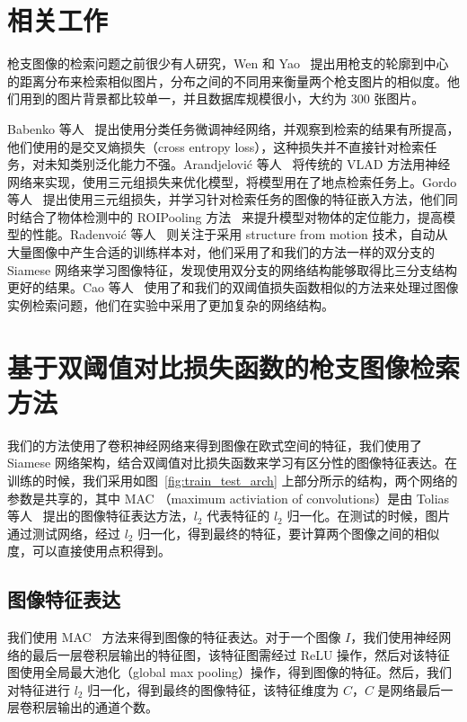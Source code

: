 \section{相关工作}\label{sec:double_margin_related_work}
枪支图像的检索问题之前很少有人研究，Wen 和 Yao~\cite{Wen2005PistolIR} 提出用枪支的轮廓到中心的距离分布来检索相似图片，分布之间的不同用来衡量两个枪支图片的相似度。他们用到的图片背景都比较单一，并且数据库规模很小，大约为 300 张图片。

Babenko 等人~\cite{Babenko2014NeuralCF} 提出使用分类任务微调神经网络，并观察到检索的结果有所提高，他们使用的是交叉熵损失（cross entropy loss），这种损失并不直接针对检索任务，对未知类别泛化能力不强。Arandjelovi{\'c} 等人~\cite{Arandjelovic2016NetVLADCA} 将传统的 VLAD 方法用神经网络来实现，使用三元组损失来优化模型，将模型用在了地点检索任务上。Gordo 等人~\cite{Gordo2016DeepIR} 提出使用三元组损失，并学习针对检索任务的图像的特征嵌入方法，他们同时结合了物体检测中的 ROIPooling 方法~\cite{Ren2017FasterRT} 来提升模型对物体的定位能力，提高模型的性能。Radenvoi{\'c} 等人~\cite{Radenovic2016CNNIR} 则关注于采用 structure from motion 技术，自动从大量图像中产生合适的训练样本对，他们采用了和我们的方法一样的双分支的 Siamese 网络来学习图像特征，发现使用双分支的网络结构能够取得比三分支结构更好的结果。Cao 等人~\cite{Cao2016QuartetnetLF} 使用了和我们的双阈值损失函数相似的方法来处理过图像实例检索问题，他们在实验中采用了更加复杂的网络结构。

\section{基于双阈值对比损失函数的枪支图像检索方法}\label{sec:double_margin_method}

我们的方法使用了卷积神经网络来得到图像在欧式空间的特征，我们使用了 Siamese 网络架构，结合双阈值对比损失函数来学习有区分性的图像特征表达。在训练的时候，我们采用如图~\ref{fig:train_test_arch} 上部分所示的结构，两个网络的参数是共享的，其中 MAC （maximum activiation of convolutions）是由 Tolias 等人~\cite{Tolias2015ParticularOR} 提出的图像特征表达方法，$l_2$ 代表特征的 $l_2$ 归一化。在测试的时候，图片通过测试网络，经过 $l_2$ 归一化，得到最终的特征，要计算两个图像之间的相似度，可以直接使用点积得到。

\subsection{图像特征表达}

我们使用 MAC~\cite{Tolias2015ParticularOR} 方法来得到图像的特征表达。对于一个图像 $I$，我们使用神经网络的最后一层卷积层输出的特征图，该特征图需经过 ReLU 操作，然后对该特征图使用全局最大池化（global max pooling）操作，得到图像的特征。然后，我们对特征进行 $l_2$ 归一化，得到最终的图像特征，该特征维度为 $C$，$C$ 是网络最后一层卷积层输出的通道个数。

